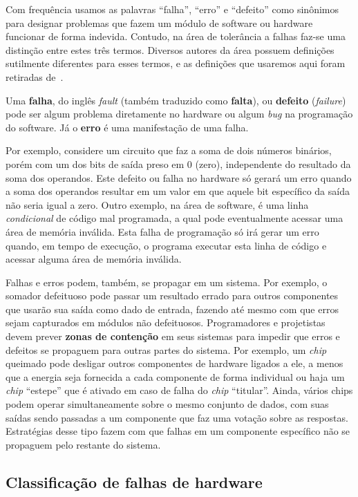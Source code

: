 Com frequência usamos as palavras ``falha'', ``erro'' e ``defeito'' como sinônimos para designar problemas que fazem um módulo de software ou hardware funcionar de forma indevida. Contudo, na área de tolerância a falhas faz-se uma distinção entre estes três termos. Diversos autores da área possuem definições sutilmente diferentes para esses termos, e as definições que usaremos aqui foram retiradas de~\cite{koren2007fault}.

Uma \textbf{falha}, do inglês \emph{fault} (também traduzido como \textbf{falta}), ou \textbf{defeito} (\emph{failure}) pode ser algum problema diretamente no hardware ou algum \emph{bug} na programação do software. Já o \textbf{erro} é uma manifestação de uma falha.

Por exemplo, considere um circuito que faz a soma de dois números binários, porém com um dos bits de saída preso em $0$ (zero), independente do resultado da soma dos operandos. Este defeito ou falha no hardware só gerará um erro quando a soma dos operandos resultar em um valor em que aquele bit específico da saída não seria igual a zero. Outro exemplo, na área de software, é uma linha \emph{condicional} de código mal programada, a qual pode eventualmente acessar uma área de memória inválida. Esta falha de programação só irá gerar um erro quando, em tempo de execução, o programa executar esta linha de código e acessar alguma área de memória inválida.

Falhas e erros podem, também, se propagar em um sistema. Por exemplo, o somador defeituoso pode passar um resultado errado para outros componentes que usarão sua saída como dado de entrada, fazendo até mesmo com que erros sejam capturados em módulos não defeituosos. Programadores e projetistas devem prever \textbf{zonas de contenção} em seus sistemas para impedir que erros e defeitos se propaguem para outras partes do sistema. Por exemplo, um \emph{chip} queimado pode desligar outros componentes de hardware ligados a ele, a menos que a energia seja fornecida a cada componente de forma individual ou haja um \emph{chip} ``estepe'' que é ativado em caso de falha do \emph{chip} ``titular''. Ainda, vários chips podem operar simultaneamente sobre o mesmo conjunto de dados, com suas saídas sendo passadas a um componente que faz uma votação sobre as respostas. Estratégias desse tipo fazem com que falhas em um componente específico não se propaguem pelo restante do sistema.


\subsection{Classificação de falhas de hardware} %
\label{sub:classificacao}

